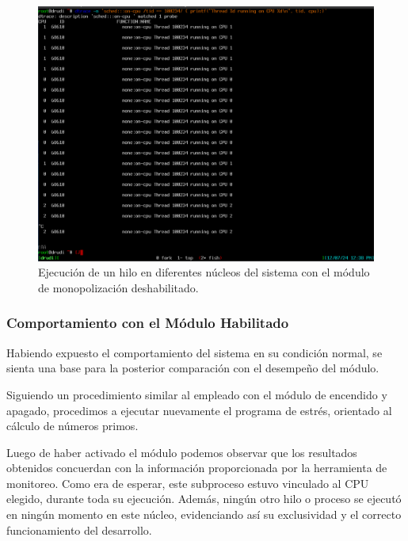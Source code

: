 \begin{figure}[H]
    \centering
    \includegraphics[width=1\textwidth]{images/dtrace_disabled.png}
    \caption{Ejecución de un hilo en diferentes núcleos del sistema con el módulo de monopolización deshabilitado.}
    \label{fig:dtrace_disabled}
\end{figure}


\subsubsection{Comportamiento con el Módulo Habilitado}
Habiendo expuesto el comportamiento del sistema en su condición normal, se sienta una base para la posterior comparación con el desempeño del módulo.\par

Siguiendo un procedimiento similar al empleado con el módulo de encendido y apagado, procedimos a ejecutar nuevamente el programa de estrés, orientado al cálculo de números primos.\par

Luego de haber activado el módulo podemos observar que los resultados obtenidos concuerdan con la información proporcionada por la  herramienta de monitoreo. Como era de esperar, este subproceso estuvo vinculado al CPU elegido, durante toda su ejecución. Además, ningún otro hilo o proceso se ejecutó en ningún momento en este núcleo, evidenciando así su exclusividad y el correcto funcionamiento del desarrollo.\par

